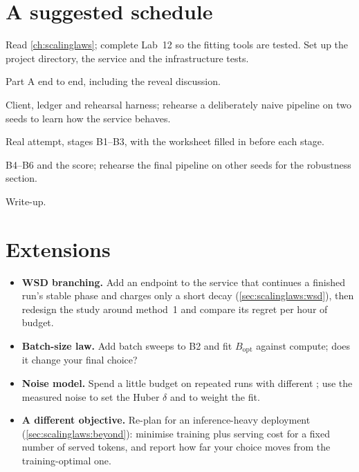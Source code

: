 \section{A suggested schedule}\label{sec:proj3:schedule}

\begin{description}[leftmargin=2.6cm, style=nextline]
\item[Day 1] Read \cref{ch:scalinglaws}; complete Lab~12 so the fitting tools are tested. Set up
      the project directory, the service and the infrastructure tests.
\item[Day 2] Part A end to end, including the reveal discussion.
\item[Day 3] Client, ledger and rehearsal harness; rehearse a deliberately naive pipeline on two
      seeds to learn how the service behaves.
\item[Day 4] Real attempt, stages B1--B3, with the worksheet filled in before each stage.
\item[Day 5] B4--B6 and the score; rehearse the final pipeline on other seeds for the
      robustness section.
\item[Day 6] Write-up.
\end{description}

\section{Extensions}\label{sec:proj3:extensions}
\begin{itemize}
\item \textbf{WSD branching.} Add an endpoint to the service that continues a finished run's
      stable phase and charges only a short decay (\cref{sec:scalinglaws:wsd}), then redesign the
      study around method~1 and compare its regret per hour of budget.
\item \textbf{Batch-size law.} Add batch sweeps to B2 and fit $B_{\text{opt}}$ against compute;
      does it change your final choice?
\item \textbf{Noise model.} Spend a little budget on repeated runs with different
      ; use the measured noise to set the Huber $\delta$ and to weight the fit.
\item \textbf{A different objective.} Re-plan for an inference-heavy deployment
      (\cref{sec:scalinglaws:beyond}): minimise training plus serving cost for a fixed number of
      served tokens, and report how far your choice moves from the training-optimal one.
\end{itemize}

